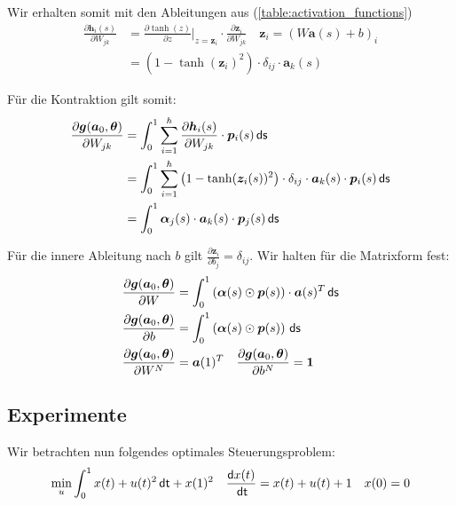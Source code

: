 \documentclass[a4paper, 12pt]{scrartcl}
\newcommand{\dt}{\thinspace \mathsf{dt}}
\newcommand{\ds}{\thinspace \mathsf{ds}}
\begin{document}
Wir erhalten somit mit den Ableitungen aus (\ref{table:activation_functions})
%
\begin{align*}
    \frac{\partial \bm{h}_i(s)}{\partial W_{jk}}
    &=
    \frac{\partial \tanh(z)}{\partial z} \bigg|_{z = \bm{z}_i} \cdot \frac{\partial \bm{z}_i}{\partial W_{jk}}
    \quad
    \bm{z}_i = \left(W \bm{a}(s) + b\right)_i 
    \\
    &=
    \left(1 - \tanh(\bm{z}_i)^2 \right) 
    \cdot
    \delta_{ij} \cdot \bm{a}_k(s)
\end{align*}

Für die Kontraktion gilt somit:
%
\begin{align*}
    \frac{\partial \bm{g}(\bm{a}_0, \bm{\theta})}{\partial W_{jk}}
    &=
    \int_{0}^{1} \sum_{i=1}^{h} 
    \frac{\partial \bm{h}_i(s)}{\partial W_{jk}} \cdot \bm{p}_i(s) \ds
    \\
    &=
    \int_{0}^{1} \sum_{i=1}^{h} 
    \left(1 - \tanh(\bm{z}_i(s))^2 \right) 
    \cdot
    \delta_{ij} \cdot \bm{a}_k(s) \cdot \bm{p}_i(s) \ds
    \\
    &=
    \int_{0}^{1}
    \bm{\alpha}_j(s)
    \cdot
    \bm{a}_k(s) \cdot \bm{p}_j(s) \ds
\end{align*}

Für die innere Ableitung nach $b$ gilt $\frac{\partial \bm{z}_i}{\partial b_{j}} = \delta_{ij}$. 
Wir halten für die Matrixform fest:
%
\begin{align*}
    \frac{\partial \bm{g}(\bm{a}_0, \bm{\theta})}{\partial W}
    &=
    \int_{0}^{1}
    \left(\bm{\alpha}(s) \odot \bm{p}(s)\right)
    \cdot
    \bm{a}(s)^T  \ds
    \\
    \frac{\partial \bm{g}(\bm{a}_0, \bm{\theta})}{\partial b}
    &=
    \int_{0}^{1}
    \left(\bm{\alpha}(s) \odot \bm{p}(s)\right) \ds
    \\
    \frac{\partial \bm{g}(\bm{a}_0, \bm{\theta})}{\partial W^N}
    &=
    \bm{a}(1)^T
    \quad
    \frac{\partial \bm{g}(\bm{a}_0, \bm{\theta})}{\partial b^N}
    =
    \bm{1}
\end{align*}



\subsection{Experimente}

Wir betrachten nun folgendes optimales Steuerungsproblem:
%
\begin{align}\label{eq:OCP_Toy_Problem}
    \min_{u} \int_{0}^{1} x(t) + u(t)^2 \dt + x(1)^2
    \quad
    \frac{\mathsf{d}x(t)}{\dt} = x(t) + u(t) + 1 
    \quad
    x(0) = 0
\end{align}
\end{document}
